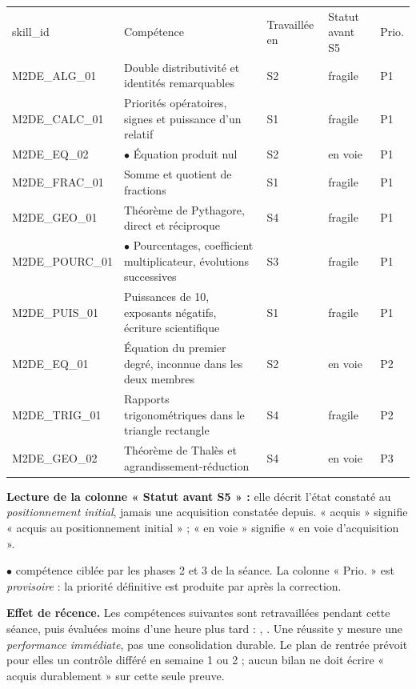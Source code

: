 \documentclass[10pt,a4paper]{article}
\begin{document}
\newpage{}
\par\noindent\begin{tabularx}{\linewidth}{>{\ttfamily\scriptsize}p{27mm} X >{\scriptsize}p{16mm} >{\scriptsize}p{20mm} >{\scriptsize\centering\arraybackslash}p{9mm}}
\rowcolor{Navy}\color{white}\scriptsize skill\_id & \color{white}Compétence & \color{white}Travaillée en & \color{white}Statut avant S5 & \color{white}Prio. \\
M2DE\_ALG\_01 & Double distributivité et identités remarquables & S2 & fragile & P1 \\
M2DE\_CALC\_01 & Priorités opératoires, signes et puissance d'un relatif & S1 & fragile & P1 \\
M2DE\_EQ\_02 & $\bullet$ Équation produit nul & S2 & en voie & P1 \\
M2DE\_FRAC\_01 & Somme et quotient de fractions & S1 & fragile & P1 \\
M2DE\_GEO\_01 & Théorème de Pythagore, direct et réciproque & S4 & fragile & P1 \\
M2DE\_POURC\_01 & $\bullet$ Pourcentages, coefficient multiplicateur, évolutions successives & S3 & fragile & P1 \\
M2DE\_PUIS\_01 & Puissances de 10, exposants négatifs, écriture scientifique & S1 & fragile & P1 \\
M2DE\_EQ\_01 & Équation du premier degré, inconnue dans les deux membres & S2 & en voie & P2 \\
M2DE\_TRIG\_01 & Rapports trigonométriques dans le triangle rectangle & S4 & fragile & P2 \\
M2DE\_GEO\_02 & Théorème de Thalès et agrandissement-réduction & S4 & en voie & P3 \\
\end{tabularx}
\par\vspace{1mm}\small\textbf{Lecture de la colonne « Statut avant S5 » :} elle décrit l'état constaté au \emph{positionnement initial}, jamais une acquisition constatée depuis. « acquis » signifie « acquis au positionnement initial » ; « en voie » signifie « en voie d'acquisition ».
\par\small$\bullet$ compétence ciblée par les phases 2 et 3 de la séance. La colonne « Prio. » est \emph{provisoire} : la priorité définitive est produite par  après la correction.
\begin{warningbox}\textbf{Effet de récence.} Les compétences suivantes sont retravaillées pendant cette séance, puis évaluées moins d'une heure plus tard : , . Une réussite y mesure une \emph{performance immédiate}, pas une consolidation durable. Le plan de rentrée prévoit pour elles un contrôle différé en semaine 1 ou 2 ; aucun bilan ne doit écrire « acquis durablement » sur cette seule preuve.\end{warningbox}
\end{document}
